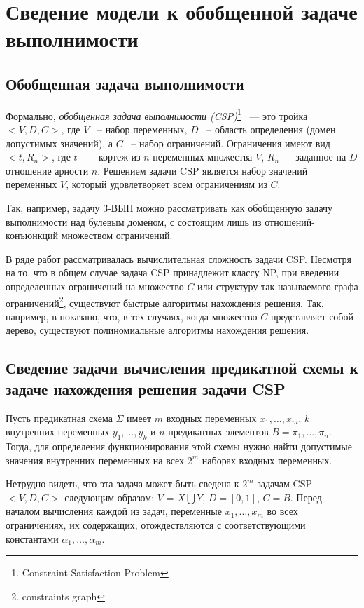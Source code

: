 \documentclass[12pt]{article}
\begin{document}
\section{Сведение модели к обобщенной задаче выполнимости}

\subsection{Обобщенная задача выполнимости}

Формально, \textit{обобщенная задача выполнимости (CSP)}\footnote{Constraint Satisfaction Problem} 
~--- это тройка $<V,D,C>$, где $V$ ~-- набор переменных, $D$ ~-- область определения (домен допустимых значений), 
а $C$ ~-- набор ограничений. Ограничения имеют вид $<t, R_n>$, где $t$ ~--- кортеж из $n$ переменных множества $V$, 
$R_n$ ~-- заданное на $D$ отношение арности $n$. 
Решением задачи CSP является набор значений переменных $V$, который удовлетворяет всем ограничениям из $C$. 

Так, например, задачу 3-ВЫП можно рассматривать как обобщенную задачу выполнимости над булевым доменом, с 
состоящим лишь из отношений-конъюнкций множеством ограничений.

В ряде работ рассматривалась вычислительная сложность задачи CSP. Несмотря на то, что в общем случае задача CSP
принадлежит классу NP, при введении определенных ограничений на множество $C$ или структуру так называемого
графа ограничений\footnote{constraints graph}, существуют быстрые алгоритмы нахождения решения. 
Так, например, в \cite{Shaeffer78} показано, 
что, в тех случаях, когда множество $C$ представляет собой дерево, существуют полиномиальные алгоритмы нахождения решения.

\subsection{Сведение задачи вычисления предикатной схемы к задаче нахождения решения задачи CSP}

Пусть предикатная схема $\Sigma$ имеет $m$ входных переменных $x_1, \ldots , x_m$, 
$k$ внутренних переменных $y_1, \ldots , y_k$ и $n$ предикатных элементов $B = \pi_1, \dots , \pi_n$. 
Тогда, для определения функционирования этой схемы нужно найти допустимые значения внутренних переменных на всех $2^{m}$
наборах входных переменных. 

Нетрудно видеть, что эта задача может быть сведена к $2^m$ задачам CSP $<V, D, C>$ следующим образом:
$V$ = $X \bigcup Y$, $D = [0, 1]$, $C = B$. Перед началом вычисления каждой из задач, переменные $x_1, \ldots , x_m$ 
во всех ограничениях, их содержащих, отождествляются с соответствующими константами $\alpha_1, \ldots , \alpha_m$.
\end{document}
